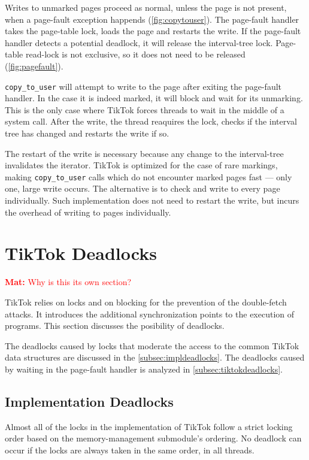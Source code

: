 \documentclass[conference]{IEEEtran}
\newcommand{\mat}[1]{\textcolor{red}{\textbf{Mat:} #1}}
\newcommand{\sysname}{TikTok}
\begin{document}
Writes to unmarked pages proceed as normal, unless the page is not present, when
a page-fault exception happends (\autoref{fig:copytouser}). The page-fault
handler takes the page-table lock, loads the page and restarts the write. If the
page-fault handler detects a potential deadlock, it will release the
interval-tree lock. Page-table read-lock is not exclusive, so it does not need
to be released (\autoref{fig:pagefault}).

\texttt{copy\_to\_user} will attempt to write to the page after exiting the
page-fault handler. In the case it is indeed marked, it will block and wait for
its unmarking. This is the only case where \sysname{} forces threads to wait in
the middle of a system call. After the write, the thread reaquires the lock,
checks if the interval tree has changed and restarts the write if so.

The restart of the write is necessary because any change to the interval-tree
invalidates the iterator. \sysname{} is optimized for the case of rare markings,
making \texttt{copy\_to\_user} calls which do not encounter marked pages fast
--- only one, large write occurs. The alternative is to check and write to every
page individually. Such implementation does not need to restart the write, but
incurs the overhead of writing to pages individually.

\section{TikTok Deadlocks}
\label{sec:deadlocks}
\mat{Why is this its own section?}

\sysname{} relies on locks and on blocking for the prevention of the
double-fetch attacks. It introduces the additional synchronization points to the
execution of programs. This section discusses the posibility of deadlocks.

The deadlocks caused by locks that moderate the access to the common \sysname{}
data structures are discussed in the \autoref{subsec:impldeadlocks}. The
deadlocks caused by waiting in the page-fault handler is analyzed in
\autoref{subsec:tiktokdeadlocks}.

\subsection{Implementation Deadlocks}
\label{subsec:impldeadlocks}

Almost all of the locks in the implementation of \sysname{} follow a strict
locking order based on the memory-management submodule's ordering. No deadlock
can occur if the locks are always taken in the same order, in all threads.
\end{document}
